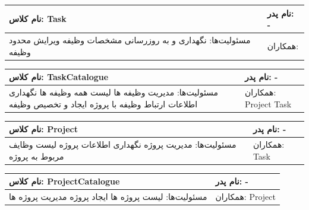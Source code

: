 \documentclass{article}
\begin{document}
\begin{tabular}{|p{6cm}|p{6cm}|}
\hline
نام کلاس: Task
&
نام پدر: -
\\
\hline
مسئولیت‌ها:
\newline
نگهداری و به روزرسانی مشخصات وظیفه
\newline
ویرایش محدود وظیفه
&
همکاران:
\\
\hline
\end{tabular}
\vspace{1cm}

\begin{tabular}{|p{6cm}|p{6cm}|}
\hline
نام کلاس: TaskCatalogue
&
نام پدر: -
\\
\hline
مسئولیت‌ها:
\newline
مدیریت وظیفه ها
\newline
لیست همه وظیفه ها
\newline
نگهداری اطلاعات ارتباط وظیفه با پروژه
\newline
ایجاد و تخصیص وظیفه

&
همکاران:
\newline
Project
\newline
Task
\\
\hline
\end{tabular}
\vspace{1cm}

\begin{tabular}{|p{6cm}|p{6cm}|}
\hline
نام کلاس: Project
&
نام پدر: -
\\
\hline
مسئولیت‌ها:
\newline
مدیریت پروژه
\newline
نگهداری اطلاعات پروژه
\newline
لیست وظایف مربوط به پروژه

&
همکاران:
\newline
 Task
\\
\hline
\end{tabular}
\vspace{1cm}


\begin{tabular}{|p{6cm}|p{6cm}|}
\hline
نام کلاس: ProjectCatalogue
&
نام پدر: -
\\
\hline
مسئولیت‌ها:
\newline
لیست پروژه ها
\newline
ایجاد پروژه
\newline
مدیریت پروژه ها 
&
همکاران:
\newline
 Project
\\
\hline
\end{tabular}
\vspace{1cm}
\end{document}
